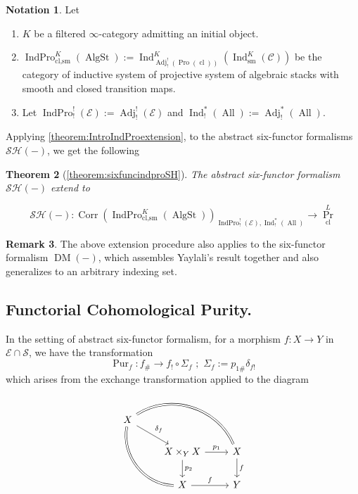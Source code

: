 \documentclass[14pt]{article}
\newtheorem{theorem}{Theorem}[subsection]
\theoremstyle{definition}
\newtheorem{remark}[theorem]{Remark}
\newtheorem{notation}[theorem]{Notation}
\newcommand{\E}{\mathcal{E}}
\newcommand{\op}[1]{\operatorname{#1}}
\renewcommand{\S}{\mathcal{S}}
\newcommand{\Ca}{\mathcal{C}}
\numberwithin{subsection}{section}
\newcommand{\SH}{\mathcal{SH}}
\begin{document}
\begin{notation}Let 
\begin{enumerate}
\item $K$ be a filtered $\infty$-category admitting an initial object.
\item $\op{IndPro}^K_{\op{cl,sm}}(\op{AlgSt}):= \op{Ind}^K_{\op{Adj}^!_!(\op{Pro}(\op{cl}))}(\op{Ind}^K_{\op{sm}}(\Ca))$ be the category of inductive system of projective system of algebraic stacks with smooth and closed transition maps. 
\item Let $\op{IndPro}^!_!(\E):= \op{Adj}^!_!(\E)$ and $\op{Ind}^*_!(\op{All}):= \op{Adj}^*_!(\op{All})$.
\end{enumerate}
\end{notation}

Applying \cref{theorem:IntroIndProextension}, to the abstract six-functor formalisms $\SH(-)$, we get the following 
\begin{theorem}[\cref{theorem:sixfuncindproSH}]
The abstract six-functor formalism $\SH(-)$ extend to 

\begin{equation}
  \SH(-) : \op{Corr}(\op{IndPro}^K_{\op{cl,sm}}(\op{AlgSt}))_{\op{IndPro}^!_!(\E),\op{Ind}^*_!(\op{All})} \to \op{Pr}^L_{\op{cl}}
\end{equation}
\end{theorem}

\begin{remark}
    The above extension procedure also applies to the six-functor formalism $\op{DM}(-)$, which assembles Yaylali's result together and also generalizes to an arbitrary indexing set.
\end{remark}

\subsection{Functorial Cohomological Purity.}
In the setting of abstract six-functor formalism, for a morphism $f: X \to Y$ in $\E \cap \S$, we have the transformation 
\begin{equation}
    \op{Pur}_f : f_{\#} \to f_! \circ \Sigma_f \,\,;\,\, \Sigma_f:= p_{1\#}\delta_{f!}
\end{equation}
which arises from the exchange transformation applied to the diagram
\begin{equation}
    \begin{tikzcd}
        X \arrow[ddr,bend right=50,equal] \arrow[drr,bend left =50, equal] \arrow[dr,"\delta_f"] & {} & {} \\
        {} & X \times_Y X \arrow[r,"p_1"] \arrow[d,"p_2"] & X \arrow[d,"f"] \\
        {} & X \arrow[r,"f"] & Y
    \end{tikzcd}
\end{equation}
\end{document}
